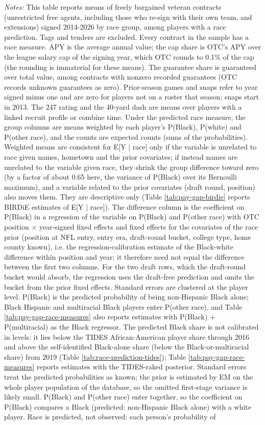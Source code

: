 {\footnotesize
\noindent\textit{Notes:} This table reports means of freely bargained veteran contracts (unrestricted free agents, including those who re-sign with their own team, and extensions) signed 2014-2026 by race group, among players with a race prediction. Tags and tenders are excluded. Every contract in the sample has a race measure. APY is the average annual value; the cap share is OTC's APY over the league salary cap of the signing year, which OTC rounds to 0.1\% of the cap (the rounding is immaterial for these means). The guarantee share is guaranteed over total value, among contracts with nonzero recorded guarantees (OTC records unknown guarantees as zero). Prior-season games and snaps refer to year signed minus one and are zero for players not on a roster that season; snaps start in 2013. The 247 rating and the 40-yard dash are means over players with a linked recruit profile or combine time. Under the predicted race measure, the group columns are means weighted by each player's P(Black), P(white) and P(other race), and the counts are expected counts (sums of the probabilities). Weighted means are consistent for E[Y $|$ race] only if the variable is unrelated to race given names, hometown and the prior covariates; if instead names are unrelated to the variable given race, they shrink the group difference toward zero (by a factor of about 0.65 here, the variance of P(Black) over its Bernoulli maximum), and a variable related to the prior covariates (draft round, position) also moves them. They are descriptive only (Table \ref{tab:pay-gap-birdie} reports BIRDiE estimates of E[Y $|$ race]). The difference column is the coefficient on P(Black) in a regression of the variable on P(Black) and P(other race) with OTC position $\times$ year-signed fixed effects and fixed effects for the covariates of the race prior (position at NFL entry, entry era, draft-round bucket, college type, home county known), i.e. the regression-calibration estimate of the Black-white difference within position and year; it therefore need not equal the difference between the first two columns. For the two draft rows, which the draft-round bucket would absorb, the regression uses the draft-free prediction and omits the bucket from the prior fixed effects. Standard errors are clustered at the player level. P(Black) is the predicted probability of being non-Hispanic Black alone; Black Hispanic and multiracial Black players enter P(other race), and Table \ref{tab:pay-gap-race-measures} also reports estimates with P(Black) + P(multiracial) as the Black regressor. The predicted Black share is not calibrated in levels: it lies below the TIDES African-American player share through 2016 and above the self-identified Black-alone share (below the Black-or-multiracial share) from 2019 (Table \ref{tab:race-prediction-tides}); Table \ref{tab:pay-gap-race-measures} reports estimates with the TIDES-raked posterior. Standard errors treat the predicted probabilities as known; the prior is estimated by EM on the whole player population of the database, so the omitted first-stage variance is likely small. P(Black) and P(other race) enter together, so the coefficient on P(Black) compares a Black (predicted: non-Hispanic Black alone) with a white player. Race is predicted, not observed: each person's probability of }
